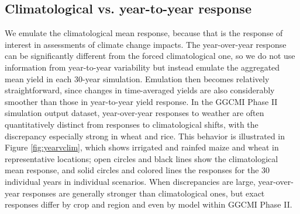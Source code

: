 \documentclass[gmd, manuscript]{copernicus} %
\begin{document}
\subsection{Climatological vs. year-to-year response}

We emulate the climatological mean response, because that is the response of interest in assessments of climate change impacts. 
The year-over-year response can be significantly different from the forced climatological one, so we do not use information from year-to-year variability but instead emulate the aggregated mean yield in each 30-year simulation. 
Emulation then becomes relatively straightforward, since changes in time-averaged yields are also considerably smoother than those in year-to-year yield response.
In the GGCMI Phase II simulation output dataset, year-over-year responses to weather are often quantitatively distinct from responses to climatological shifts, with the discrepancy especially strong in wheat and rice. 
This behavior is illustrated in Figure \ref{fig:yearvclim}, which shows irrigated and rainfed maize and wheat in representative locations; open circles and black lines show the climatological mean response, and solid circles and colored lines the responses for the 30 individual years in individual scenarios.  
When discrepancies are large, year-over-year responses are generally stronger than climatological ones, but exact responses differ by crop and region and even by model within GGCMI Phase II. 
\end{document}
